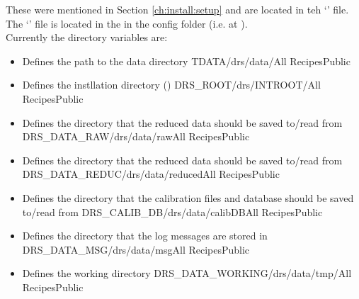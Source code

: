 These were mentioned in Section \ref{ch:install:setup} and are located in teh `\configtxtfile' file. The `\configtxtfile' file is located in the \InstallDIR in the config folder (i.e. at ). \\

Currently the directory variables are:

\begin{itemize}


\item {}
{Defines the path to the data directory}
{TDATA}{/drs/data/}{All Recipes}{\configtxtfile}{Public}

\item {}
{Defines the instllation directory (\InstallDIR)}
{DRS\_ROOT}{/drs/INTROOT/}{All Recipes}{\configtxtfile}{Public}

\item {}
{Defines the directory that the reduced data should be saved to/read from}
{DRS\_DATA\_RAW}{/drs/data/raw}{All Recipes}{\configtxtfile}{Public}

\item {}
{Defines the directory that the reduced data should be saved to/read from}
{DRS\_DATA\_REDUC}{/drs/data/reduced}{All Recipes}{\configtxtfile}{Public}

\item {}
{Defines the directory that the calibration files and database should be saved to/read from}
{DRS\_CALIB\_DB}{/drs/data/calibDB}{All Recipes}{\configtxtfile}{Public}

\item {}
{Defines the directory that the log messages are stored in}
{DRS\_DATA\_MSG}{/drs/data/msg}{All Recipes}{\configtxtfile}{Public}

\item {}
{Defines the working directory}
{DRS\_DATA\_WORKING}{/drs/data/tmp/}{All Recipes}{\configtxtfile}{Public}

\end{itemize}

